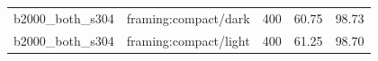 \begin{longtable}{l>{\raggedright\arraybackslash}p{.42\linewidth}rrr}
b2000\_\allowbreak{}both\_\allowbreak{}s304 & %
framing:compact/dark & %
400 & %
60.75 & %
98.73 \\ %

b2000\_\allowbreak{}both\_\allowbreak{}s304 & %
framing:compact/light & %
400 & %
61.25 & %
98.70 \\ %


\end{longtable}
